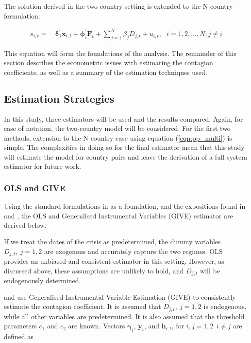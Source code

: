 \documentclass[../base.tex]{subfiles}
\begin{document}
The solution derived in the two-country setting is extended to the N-country formulation:

\begin{align}
	s_{i,t} =&~\boldsymbol{\delta}_1^{\prime} \mathbf{x}_{i,t} + \boldsymbol{\phi}_i^{\prime} \mathbf{F}_t + \sum_{j=1}^{N}\beta_j D_{j,t} + u_{i,t}, ~~~ i = 1,2,...,N ; j \neq i
	\label{eqn:pp_multi}	
\end{align}

This equation will form the foundations of the analysis. The remainder of this section describes the econometric issues with estimating the contagion coefficients, as well as a summary of the estimation techniques used. 


\subsection{Estimation Strategies}
\label{est_strat}

In this study, three estimators will be used and the results compared. Again, for ease of notation, the two-country model will be considered. For the first two methods, extension to the N country case using equation (\ref{eqn:pp_multi}) is simple. The complexities in doing so for the final estimator mean that this study will estimate the model for country pairs and leave the derivation of a full system estimator for future work. 

\subsubsection{OLS and GIVE}

Using the standard formulations in \cite{hayashi2000econometrics} as a foundation, and the expositions found in \cite{pesaran2007econometric} and \cite{massacci2007identification}, the OLS and Generalised Instrumental Variables (GIVE) estimator are derived below.

If we treat the dates of the crisis as predetermined, the dummy variables $D_{j,t}, ~ j = 1, 2$ are exogenous and accurately capture the two regimes. OLS provides an unbiased and consistent estimator in this setting. However, as discussed above, these assumptions are unlikely to hold, and $D_{j,t}$ will be endogenously determined. 

\cite{pesaran2007econometric} and \cite{metiu2012sovereign} use Generalised Instrumental Variable Estimation (GIVE) to consistently estimate the contagion coefficient. It is assumed that $D_{j,t},~ j = 1, 2$ is endogenous, while all other variables are predetermined. It is also assumed that the threshold parameters $c_1$ and $c_2$ are known. Vectors $\boldsymbol{\gamma}_i$, $\mathbf{y}_i$, and $\mathbf{h}_{i,t}$, for $i,j = 1,2 ~~ i \neq j$ are defined as 
\end{document}
